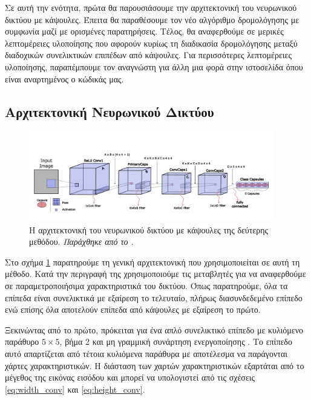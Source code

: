 Σε αυτή την ενότητα, πρώτα θα παρουσιάσουμε την αρχιτεκτονική του νευρωνικού δικτύου με κάψουλες. Έπειτα θα παραθέσουμε τον νέο αλγόριθμο δρομολόγησης με συμφωνία μαζί με ορισμένες παρατηρήσεις. Τέλος, θα αναφερθούμε σε μερικές λεπτομέρειες υλοποίησης που αφορούν κυρίως τη διαδικασία δρομολόγησης μεταξύ διαδοχικών συνελικτικών επιπέδων από κάψουλες. Για περισσότερες λεπτομέρειες υλοποίησης, παραπέμπουμε τον αναγνώστη για άλλη μια φορά στην ιστοσελίδα όπου είναι αναρτημένος ο κώδικάς μας.

\subsection{Αρχιτεκτονική Νευρωνικού Δικτύου}

\begin{figure}[h]
  \centering
  \includegraphics[width=0.95\textwidth]{images/chapter method/second_method_architecxture.pdf}
  \caption{Η αρχιτεκτονική του νευρωνικού δικτύου με κάψουλες της δεύτερης μεθόδου. \textit{Παράχθηκε από το \href{https://inkscape.org/}{}}.}
  \label{fig:method_2_architecture}
\end{figure}

Στο σχήμα \ref{fig:method_2_architecture} παρατηρούμε τη γενική αρχιτεκτονική που χρησιμοποιείται σε αυτή τη μέθοδο. Κατά την περιγραφή της χρησιμοποιούμε τις μεταβλητές  για να αναφερθούμε σε παραμετροποιήσιμα χαρακτηριστικά του δικτύου. Όπως παρατηρούμε, όλα τα επίπεδα είναι συνελικτικά με εξαίρεση το τελευταίο, πλήρως διασυνδεδεμένο επίπεδο ενώ επίσης όλα αποτελούν επίπεδα από κάψουλες με εξαίρεση το πρώτο.\par

Ξεκινώντας από το πρώτο, πρόκειται για ένα απλό συνελικτικό επίπεδο με κυλιόμενο παράθυρο $5 \times 5$, βήμα 2 και μη γραμμική συνάρτηση ενεργοποίησης . Το επίπεδο αυτό απαρτίζεται από  τέτοια κυλιόμενα παράθυρα με αποτέλεσμα να παράγονται  χάρτες χαρακτηριστικών. Η διάσταση των χαρτών χαρακτηριστικών εξαρτάται από το μέγεθος της εικόνας εισόδου και μπορεί να υπολογιστεί από τις σχέσεις \ref{eq:width_conv} και  \ref{eq:height_conv}.\par

